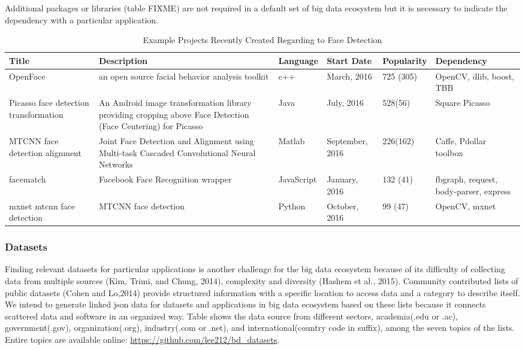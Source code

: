 \documentclass[9pt,twocolumn,twoside]{styles/osajnl}
\newcommand{\TODO}[1]{\todo[inline]{#1}}
\newcommand{\FIXME}[1]{\TODO{WILL BE FIXED BEFORE SUBMISSION BY #1}}
\begin{document}
Additional packages or libraries (table FIXME) are not required in
a default set of big data ecosystem but it is necessary to indicate the
dependency with a particular application. 

\begin{table}[htb]
  \begin{center}
    \begin{small}
      \begin{tabular}{p{2cm}|p{5cm}|l|l|l|p{3cm}}

    Title & Description & Language & Start Date & Popularity & Dependency \\ \hline  \hline
    OpenFace &  an open source facial behavior analysis toolkit & c++ & March, 2016 & 725 (305) & OpenCV, dlib, boost, TBB \\ \hline
    Picasso face detection transformation & An Android image transformation library providing cropping above Face Detection (Face Centering) for Picasso & Java & July, 2016 & 528(56) & Square Picasso \\ \hline
    MTCNN face detection alignment & Joint Face Detection and Alignment using Multi-task Cascaded Convolutional Neural Networks & Matlab & September, 2016 & 226(162)  &  Caffe, Pdollar toolbox \\ \hline
    facematch & Facebook Face Recognition wrapper & JavaScript & January, 2016 & 132 (41) & fbgraph, request, body-parser, express \\ \hline
    mxnet mtcnn face detection & MTCNN face detection & Python  & October, 2016 & 99 (47) & OpenCV, mxnet \\ 


  \end{tabular}
  \caption{Example Projects Recently Created Regarding to Face Detection}
  \label{tab:project-examples-face}
\end{small}
  \end{center}
\end{table}


\subsubsection{Datasets}

Finding relevant datasets for particular applications is another
challenge for the big data ecosystem because of its difficulty of
collecting data from multiple sources (Kim, Trimi, and Chung, 2014),
complexity and diversity (Hashem et al., 2015). Community contributed
lists of public datasets (Cohen and Lo,2014) provide structured
information with a specific location to access data and a category to
describe itself. We intend to generate linked json data for datasets
and applications in big data ecosystem based on these lists because it
connects scattered data and software in an organized way. Table \FIXME{Who?}
shows the data source from different sectors, academia(.edu or .ac),
government(.gov), organization(.org), industry(.com or .net), and
international(country code in suffix), among the seven topics of the
lists. Entire topics are available online:
\url{https://github.com/lee212/bd_datasets}.
\end{document}
